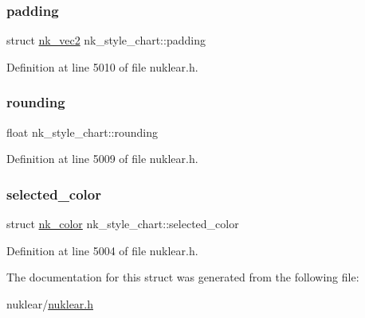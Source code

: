\subsubsection{\texorpdfstring{padding}{padding}}
{\footnotesize\ttfamily struct \mbox{\hyperlink{structnk__vec2}{nk\+\_\+vec2}} nk\+\_\+style\+\_\+chart\+::padding}



Definition at line 5010 of file nuklear.\+h.

\mbox{\label{structnk__style__chart_a178316102e8723bef6ba2c7e6c8ba0ed}} 
\subsubsection{\texorpdfstring{rounding}{rounding}}
{\footnotesize\ttfamily float nk\+\_\+style\+\_\+chart\+::rounding}



Definition at line 5009 of file nuklear.\+h.

\mbox{\label{structnk__style__chart_ad1227179245ac3164d9e40b05b703926}} 
\subsubsection{\texorpdfstring{selected\+\_\+color}{selected\_color}}
{\footnotesize\ttfamily struct \mbox{\hyperlink{structnk__color}{nk\+\_\+color}} nk\+\_\+style\+\_\+chart\+::selected\+\_\+color}



Definition at line 5004 of file nuklear.\+h.



The documentation for this struct was generated from the following file\+:\begin{DoxyCompactItemize}
\item 
nuklear/\mbox{\hyperlink{nuklear_8h}{nuklear.\+h}}\end{DoxyCompactItemize}
